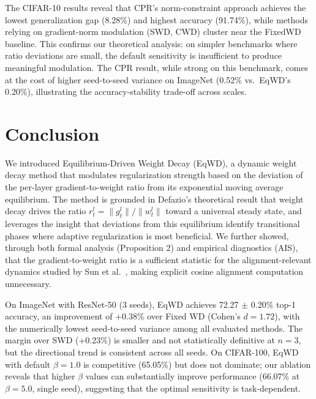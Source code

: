 \documentclass{article}
\begin{document}
The CIFAR-10 results reveal that CPR's norm-constraint approach achieves
the lowest generalization gap (8.28\%) and highest accuracy (91.74\%),
while methods relying on gradient-norm modulation (SWD, CWD) cluster
near the FixedWD baseline. This confirms our theoretical analysis: on
simpler benchmarks where ratio deviations are small, the default
sensitivity is insufficient to produce meaningful modulation. The
CPR result, while strong on this benchmark, comes at the cost of higher
seed-to-seed variance on ImageNet (0.52\% vs.\ EqWD's 0.20\%),
illustrating the accuracy-stability trade-off across scales.

\section{Conclusion}
\label{sec:conclusion}

We introduced Equilibrium-Driven Weight Decay (EqWD), a dynamic weight
decay method that modulates regularization strength based on the
deviation of the per-layer gradient-to-weight ratio from its exponential
moving average equilibrium. The method is grounded in Defazio's
\citep{defazio2025} theoretical result that weight decay drives the ratio
$r_t^l = \|g_t^l\| / \|w_t^l\|$ toward a universal steady state, and
leverages the insight that deviations from this equilibrium identify
transitional phases where adaptive regularization is most beneficial. We
further showed, through both formal analysis (Proposition 2) and
empirical diagnostics (AIS), that the gradient-to-weight ratio is a
sufficient statistic for the alignment-relevant dynamics studied by Sun
et al.~\citep{sun2025cvpr}, making explicit cosine alignment computation
unnecessary.

On ImageNet with ResNet-50 (3 seeds),
EqWD achieves 72.27 $\pm$ 0.20\% top-1 accuracy, an improvement of
+0.38\% over Fixed WD (Cohen's $d = 1.72$), with the numerically
lowest seed-to-seed variance among all evaluated methods. The margin
over SWD (+0.23\%) is smaller and not statistically definitive at
$n = 3$, but the directional trend is consistent across all seeds. On
CIFAR-100, EqWD with default $\beta = 1.0$ is competitive (65.05\%)
but does not dominate; our ablation reveals that higher $\beta$ values
can substantially improve performance (66.07\% at $\beta = 5.0$,
single seed), suggesting that the optimal sensitivity is task-dependent.
\end{document}

